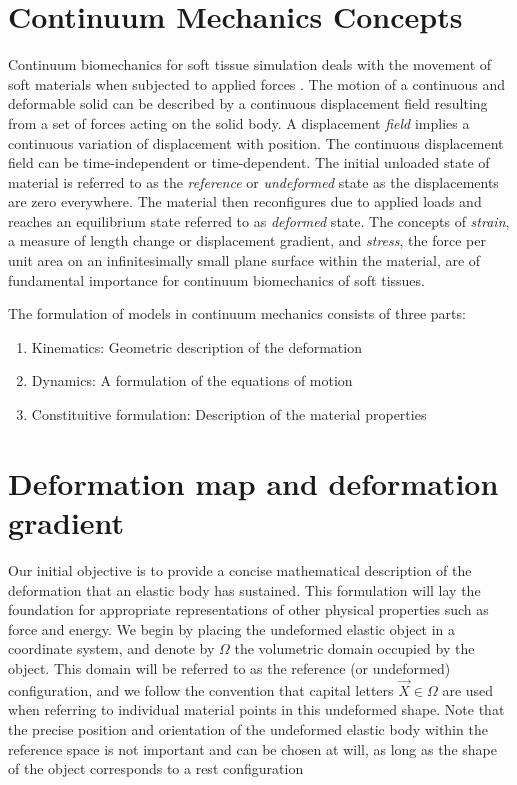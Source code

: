 \section{Continuum Mechanics Concepts} 
Continuum biomechanics for soft tissue simulation deals with the movement of soft materials when subjected to applied forces \cite{Sifakis2012}. 
The motion of a continuous and deformable solid can be described by a continuous displacement field resulting from a set of 
forces acting on the solid body. A displacement \textit{field} implies a continuous variation of displacement with position. 
The continuous displacement field can be time-independent or time-dependent. The initial unloaded state of material is referred to 
as the \textit{reference} or \textit{undeformed} state as the displacements are zero everywhere. The material then reconfigures due to 
applied loads and reaches an equilibrium state referred to as \textit{deformed} state. The concepts of \textit{strain}, a measure of length
change or displacement gradient, and \textit{stress}, the force per unit area on an infinitesimally small plane surface within the material, 
are of fundamental importance for continuum biomechanics of soft tissues. 

The formulation of models in continuum mechanics consists of three parts:

\begin{enumerate}
 \item Kinematics: Geometric description of the deformation
 \item Dynamics: A formulation of the equations of motion
 \item Constituitive formulation: Description of the material properties
\end{enumerate}

\section{Deformation map and deformation gradient}
Our initial objective is to provide a concise mathematical description of the deformation that an elastic body has sustained. This formulation will 
lay the foundation for appropriate representations of other physical properties such as force and energy. We begin by placing the undeformed elastic 
object in a coordinate system, and denote by $\Omega$ the volumetric domain occupied by the object. This domain will be referred to as the reference 
(or undeformed) configuration, and we follow the convention that capital letters $\vec{X} \in \Omega$ are used when referring to individual material
points in this undeformed shape. Note that the precise position and orientation of the undeformed elastic body within the reference space is not important 
and can be chosen at will, as long as the shape of the object corresponds to a rest configuration

